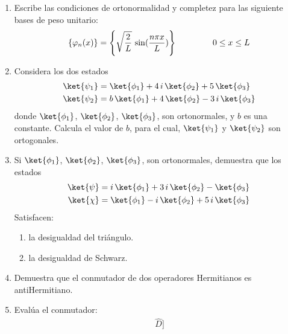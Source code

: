 \begin{enumerate}
\item Escribe las condiciones de ortonormalidad y completez para las siguiente bases de peso unitario:
\begin{align*}
\left\{ \varphi_{n} (x) \right\} = \left\{ \sqrt{\dfrac{2}{L}} \, \sin (\dfrac{n \pi x}{L}) \right\} \hspace{1.5cm} 0 \leq x \leq L\end{align*}
\item Considera los dos estados
\begin{align*}
\ket{\psi_{1}} &= \ket{\phi_{1}} + 4 \, i \, \ket{\phi_{2}} + 5 \, \ket{\phi_{3}} \\
\ket{\psi_{2}} &= b \, \ket{\phi_{1}} + 4 \, \ket{\phi_{2}} - 3 \, i \, \ket{\phi_{3}}
\end{align*}
donde $\ket{\phi_{1}}$, $\ket{\phi_{2}}$, $\ket{\phi_{3}}$, son ortonormales, y $b$ es una constante. Calcula el valor de $b$, para el cual, $\ket{\psi_{1}}$ y $\ket{\psi_{2}}$ son ortogonales.
\item Si $\ket{\phi_{1}}$, $\ket{\phi_{2}}$, $\ket{\phi_{3}}$, son ortonormales, demuestra que los estados
\begin{align*}
\ket{\psi} &= i \, \ket{\phi_{1}} + 3 \, i \, \ket{\phi_{2}} - \ket{\phi_{3}} \\
\ket{\chi} &= \ket{\phi_{1}} - i \, \ket{\phi_{2}} + 5 \, i \, \ket{\phi_{3}}
\end{align*}
Satisfacen:
\begin{enumerate}[label=\alph*)]
\item la desigualdad del triángulo.
\item la desigualdad de Schwarz.
\end{enumerate}
\item Demuestra que el conmutador de dos operadores Hermitianos es antiHermitiano.
\item Evalúa el conmutador:
\begin{align*}
[ \hat{A}, [\hat{B}, \hat{C}] \, \hat{D} ]
\end{align*}

\end{enumerate}

